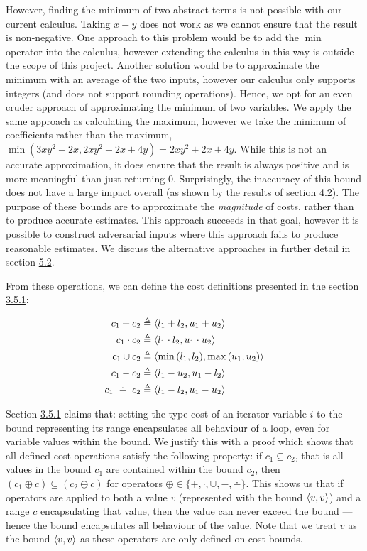 However, finding the minimum of two abstract terms is not possible with our current calculus. Taking \( x - y \) does not work as we cannot ensure that the result is non-negative. One approach to this problem would be to add the \( \min \) operator into the calculus, however extending the calculus in this way is outside the scope of this project. Another solution would be to approximate the minimum with an average of the two inputs, however our calculus only supports integers (and does not support rounding operations). Hence, we opt for an even cruder approach of approximating the minimum of two variables. We apply the same approach as calculating the maximum, however we take the minimum of coefficients rather than the maximum, \( {\min(3xy^2 + 2x, 2xy^2 + 2x + 4y) = 2xy^2 + 2x + 4y} \). While this is not an accurate approximation, it does ensure that the result is always positive and is more meaningful than just returning \( 0 \). Surprisingly, the inaccuracy of this bound does not have a large impact overall (as shown by the results of section \hyperref[sec:4.2]{4.2}). The purpose of these bounds are to approximate the \textit{magnitude} of costs, rather than to produce accurate estimates. This approach succeeds in that goal, however it is possible to construct adversarial inputs where this approach fails to produce reasonable estimates. We discuss the alternative approaches in further detail in section \hyperref[sec:5.2]{5.2}.

From these operations, we can define the cost definitions presented in the section \hyperref[sec:3.5.1]{3.5.1}:

\begin{align*}
  c_1 + c_2         & \triangleq \bound{l_1 + l_2}{u_1 + u_2}               \\
  c_1 \cdot c_2     & \triangleq \bound{l_1 \cdot l_2}{u_1 \cdot u_2}       \\
  c_1 \cup c_2      & \triangleq \bound{\min{(l_1, l_2)}}{\max{(u_1, u_2)}} \\
  c_1 - c_2         & \triangleq \bound{l_1 - u_2}{u_1 - l_2}               \\
  c_1 \dotminus c_2 & \triangleq \bound{l_1 - l_2}{u_1 - u_2}               \\
\end{align*}

Section \hyperref[sec:3.5.1]{3.5.1} claims that: setting the type cost of an iterator variable \( i \) to the bound representing its range encapsulates all behaviour of a loop, even for variable values within the bound. We justify this with a proof which shows that all defined cost operations satisfy the following property: if \( c_1 \subseteq c_2 \), that is all values in the bound \( c_1 \) are contained within the bound \( c_2 \), then \( (c_1 \oplus c) \subseteq (c_2 \oplus c) \) for operators \( \oplus \in \{ +, \cdot, \cup, -, \dotminus \}\). This shows us that if operators are applied to both a value \( v \) (represented with the bound \( \langle{v, v}\rangle \)) and a range \( c \) encapsulating that value, then the value can never exceed the bound --- hence the bound encapsulates all behaviour of the value. Note that we treat \( v \) as the bound \( \langle{v, v}\rangle \) as these operators are only defined on cost bounds.

